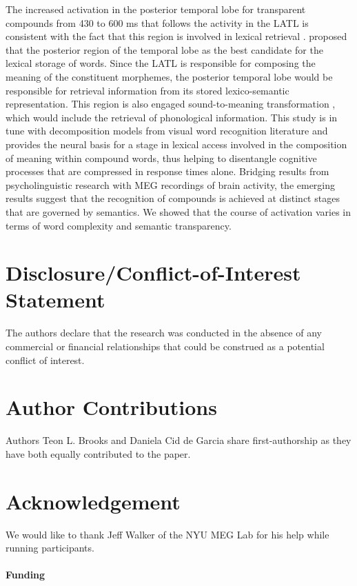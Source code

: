 \documentclass{frontiersSCNS}
\begin{document}
The increased activation in the posterior temporal lobe for transparent compounds from 430 to 600 ms that follows the activity in the LATL is consistent with the fact that this region is involved in lexical retrieval \citep{Lau:2008, Hickok:2007}. \cite{Lau:2008} proposed that the posterior region of the temporal lobe as the best candidate for the lexical storage of words. Since the LATL is responsible for composing the meaning of the constituent morphemes, the posterior temporal lobe would be responsible for retrieval information from its stored lexico-semantic representation. This region is also engaged sound-to-meaning transformation \citep{Binder:2000}, which would include the retrieval of phonological information. 
This study is in tune with decomposition models from visual word recognition literature and provides the neural basis for a stage in lexical access involved in the composition of meaning within compound words, thus helping to disentangle cognitive processes that are compressed in response times alone.  Bridging results from psycholinguistic research with MEG recordings of brain activity, the emerging results suggest that the recognition of compounds is achieved at distinct stages that are governed by semantics. We showed that the course of activation varies in terms of word complexity and semantic transparency. 

\section*{Disclosure/Conflict-of-Interest Statement}
The authors declare that the research was conducted in the absence of any commercial or financial relationships that could be construed as a potential conflict of interest.

\section*{Author Contributions}
Authors Teon L. Brooks and Daniela Cid de Garcia share first-authorship as they have both equally contributed to the paper.

\section*{Acknowledgement}
We would like to thank Jeff Walker of the NYU MEG Lab for his help while running participants.

\paragraph{Funding\textcolon} 		 	 	 		
					
\end{document}
